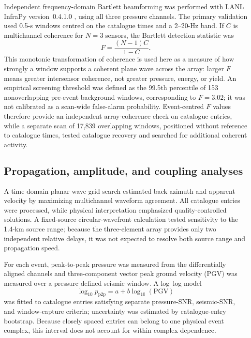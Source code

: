 \documentclass[]{seismica}
\begin{document}
Independent frequency-domain Bartlett beamforming was performed with LANL
InfraPy version~0.4.1.0 \citep{webster_infrapy_2025}, using all three pressure
channels. The primary validation used 0.5-s windows centred on the catalogue
times and a 2--20-Hz band. If $C$ is multichannel coherence for $N=3$
sensors, the Bartlett detection statistic was
\begin{equation}
 F=\frac{(N-1)C}{1-C}.
\end{equation}
This monotonic transformation of coherence is used here as a measure of how
strongly a window supports a coherent plane wave across the array: larger
$F$ means greater intersensor coherence, not greater pressure, energy, or
yield. An empirical screening threshold was defined as the 99.5th percentile
of 153 nonoverlapping pre-event background windows, corresponding to $F=3.02$;
it was not calibrated as a scan-wide false-alarm probability. Event-centred
$F$ values therefore provide an independent array-coherence check on catalogue
entries, while a separate scan of 17,839 overlapping windows, positioned
without reference to catalogue times, tested catalogue recovery and searched
for additional coherent activity.

\subsection{Propagation, amplitude, and coupling analyses}

A time-domain planar-wave grid search estimated back azimuth and apparent
velocity by maximizing multichannel waveform agreement. All catalogue entries
were processed, while physical interpretation emphasized quality-controlled
solutions. A fixed-source circular-wavefront calculation tested sensitivity to
the 1.4-km source range; because the three-element array provides only two
independent relative delays, it was not expected to resolve both source range
and propagation speed.

For each event, peak-to-peak pressure was measured from the differentially
aligned channels and three-component vector peak ground velocity (PGV) was
measured over a pressure-defined seismic window. A log--log model
\begin{equation}
 \log_{10}p_{\mathrm{p2p}}=a+b\log_{10}(\mathrm{PGV})
 \label{eq:power_law}
\end{equation}
was fitted to catalogue entries satisfying separate pressure-SNR, seismic-SNR,
and window-capture criteria; uncertainty was estimated by catalogue-entry
bootstrap. Because closely spaced entries can belong to one physical event
complex, this interval does not account for within-complex dependence.
\end{document}
